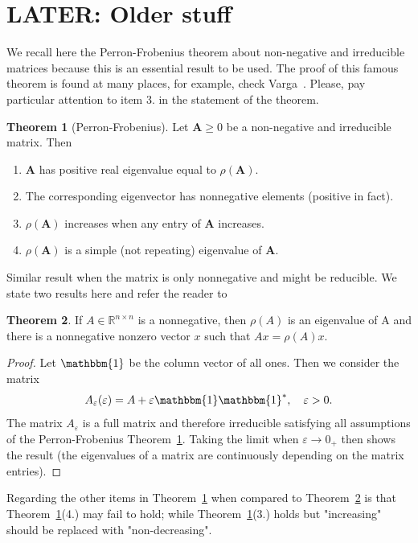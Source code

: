\documentclass[12pt]{amsart}
\theoremstyle{definition}
\newtheorem{theorem}{Theorem}[section]
\begin{document}
\section{LATER: Older stuff}
We recall here the Perron-Frobenius theorem about non-negative and irreducible matrices because this is an essential result to be used. The proof of this famous theorem is found at many places, for example, check Varga~\cite[Theorem 2.7]{2000Varga-aa}. Please, pay particular attention to item 3. in the statement of the theorem. 
\begin{theorem}[Perron-Frobenius]\label{pf}
  Let $\bm A\geq 0$ be a non-negative and irreducible matrix. Then
  \begin{enumerate}
  \item $\bm A$ has positive real eigenvalue equal to $\rho(\bm A)$.
  \item The corresponding eigenvector has nonnegative elements (positive in fact).
  \item $\rho(\bm A)$ increases when any entry of $\bm A$ increases.
  \item $\rho(\bm A)$ is a simple (not repeating) eigenvalue of $\bm A$.
  \end{enumerate}
\end{theorem}

{\color{magenta} Similar result when the matrix is only nonnegative and might be reducible. We state two results here and refer the reader to~\cite[Section 8.3]{1985Horn_Johnson}
}
\begin{theorem}\label{reducible}
If $A\in \mathds{R}^{n\times n}$ is a nonnegative, then $\rho(A)$ is an eigenvalue of A and there 
is a nonnegative nonzero vector $x$ such that $Ax=\rho(A)x$.
\end{theorem}
\begin{proof}\cite[Theorem 8.3.1]{1985Horn_Johnson}
Let $\mathbbm{1}$ be the column vector of all ones. Then we consider the matrix 
\[
A_{\varepsilon}(\varepsilon)=A+\varepsilon \mathbbm{1}\mathbbm{1}^*, \quad \varepsilon>0.
\]
The matrix $A_{\varepsilon}$ is a full matrix and therefore irreducible satisfying all assumptions of the Perron-Frobenius Theorem~\ref{pf}. Taking the limit when $\varepsilon\to 0_+$ then shows the result (the eigenvalues of a matrix are continuously depending on the matrix entries). 
\end{proof}

Regarding the other items in Theorem~\ref{pf} when compared to Theorem~\ref{reducible} is that Theorem~\ref{pf}(4.) may fail to hold; while Theorem~\ref{pf}(3.) holds but "increasing" should be replaced with "non-decreasing".
\end{document}
